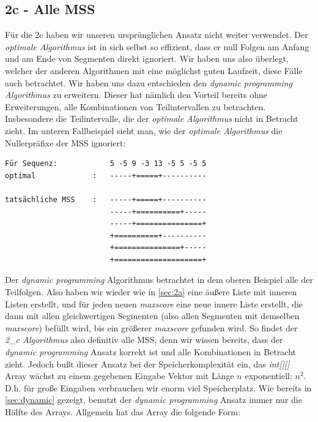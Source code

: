 \documentclass[10pt]{article}
\begin{document}
\subsection{2c - Alle MSS}\label{sec:2c}

Für die 2c haben wir unseren ursprünglichen Ansatz nicht weiter verwendet. Der \textit{optimale Algorithmus} ist in sich selbst so effizient,
dass er null Folgen am Anfang und am Ende von Segmenten direkt ignoriert. Wir haben uns also überlegt, welcher der anderen 
Algorithmen mit eine möglichst guten Laufzeit, diese Fälle auch betrachtet. Wir haben uns dazu entschieden 
den \textit{dynamic programming Algorithmus} zu erweitern. Dieser hat nämlich den Vorteil
bereits ohne Erweiterungen, alle Kombinationen von Teilintervallen zu betrachten. Insbesondere die Teilintervalle,
die der \textit{optimale Algorithmus} nicht in Betracht zieht. Im unteren Fallbeispiel sieht man, wie der \textit{optimale Algorithmus}
die Nullerpräfixe der MSS ignoriert:
\begin{verbatim}
Für Sequenz:            5 -5 9 -3 13 -5 5 -5 5
optimal             :   -----+=====+----------

tatsächliche MSS    :   -----+=====+----------
                        -----+==========+-----
                        -----+===============+
                        +==========+----------
                        +===============+-----
                        +====================+
\end{verbatim}

Der \textit{dynamic programming} Algorithmus betrachtet in dem oberen Beispiel alle der Teilfolgen. 
Also haben wir wieder wie in \ref{sec:2a} eine äu\ss ere Liste mit inneren Listen erstellt, und für jeden neuen \textit{maxscore} eine neue innere Liste
erstellt, die dann mit allen gleichwertigen Segmenten (also allen Segmenten mit demselben \textit{maxscore}) befüllt wird, bis ein grö\ss erer \textit{maxscore} gefunden wird.
So findet der \textit{2\_c Algorithmus} also definitiv alle MSS, denn wir wissen bereits, dass der \textit{dynamic programming} Ansatz korrekt ist und
alle Kombinationen in Betracht zieht. Jedoch bu\ss t dieser Ansatz bei der Speicherkomplexität ein, das \textit{int[][]} Array wächst 
zu einem gegebenen Eingabe Vektor mit Länge $n$ exponentiell: $n^{2}$. D.h. für gro\ss e Eingaben verbrauchen wir enorm viel
Speicherplatz. 
Wie bereits in \ref{sec:dynamic} gezeigt, benutzt der \textit{dynamic programming} Ansatz immer nur 
die Hälfte des Arrays. Allgemein hat das Array die folgende Form:
\end{document}
